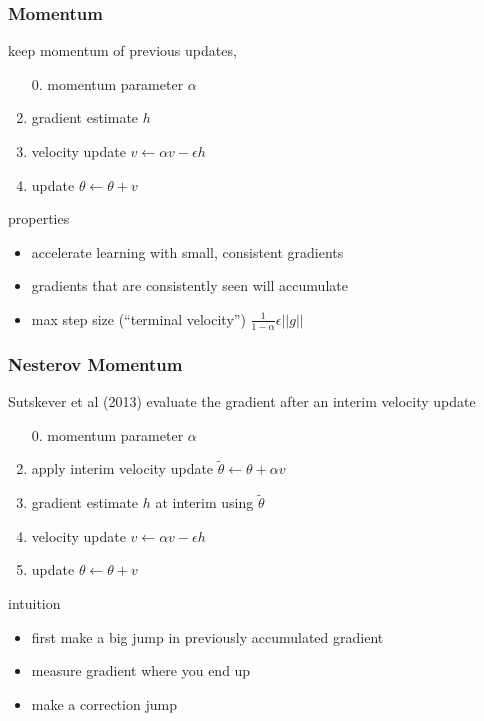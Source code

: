 \documentclass[]{article}
\begin{document}
\subsubsection{Momentum}

keep momentum of previous updates,
\begin{enumerate}
    \item[0.] momentum parameter $\alpha$
    \item gradient estimate $h$
    \item velocity update $v \gets \alpha v - \epsilon h$
    \item update $\theta \gets \theta + v$
\end{enumerate}

properties
\begin{itemize}
    \item accelerate learning with small, consistent gradients
    \item gradients that are consistently seen will accumulate
    \item max step size (``terminal velocity'') $\frac{1}{1-\alpha} \epsilon ||g||$
\end{itemize}

\subsubsection{Nesterov Momentum}%
\label{ssub:nesterov_momentum}

Sutskever et al (2013) evaluate the gradient after an interim velocity update
\begin{enumerate}
    \item[0.] momentum parameter $\alpha$
    \item apply interim velocity update $\tilde \theta \gets \theta + \alpha v$
    \item gradient estimate $h$ at interim using $\tilde \theta$
    \item velocity update $v \gets \alpha v - \epsilon h$
    \item update $\theta \gets \theta + v$
\end{enumerate}

intuition
\begin{itemize}
    \item first make a big jump in previously accumulated gradient
    \item measure gradient where you end up
    \item make a correction jump
\end{itemize}
\end{document}
